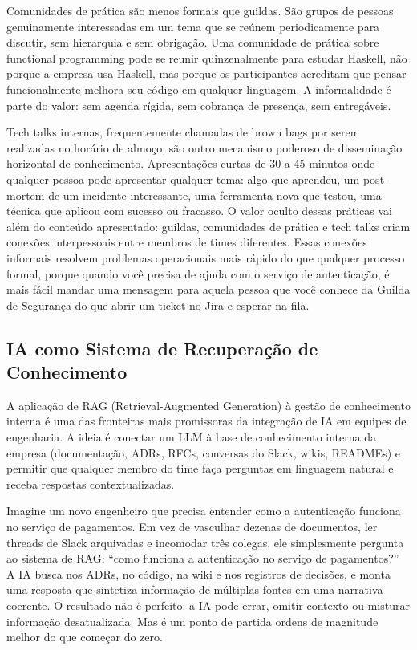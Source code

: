 Comunidades de prática são menos formais que guildas. São grupos de pessoas
genuinamente interessadas em um tema que se reúnem periodicamente para
discutir, sem hierarquia e sem obrigação. Uma comunidade de prática sobre
functional programming pode se reunir quinzenalmente para estudar Haskell,
não porque a empresa usa Haskell, mas porque os participantes acreditam que
pensar funcionalmente melhora seu código em qualquer linguagem. A informalidade
é parte do valor: sem agenda rígida, sem cobrança de presença, sem entregáveis.

Tech talks internas, frequentemente chamadas de brown bags por serem
realizadas no horário de almoço, são outro mecanismo poderoso de
disseminação horizontal de conhecimento. Apresentações curtas de 30 a 45
minutos onde qualquer pessoa pode apresentar qualquer tema: algo que aprendeu,
um post-mortem de um incidente interessante, uma ferramenta nova que testou,
uma técnica que aplicou com sucesso ou fracasso. O valor oculto dessas
práticas vai além do conteúdo apresentado: guildas, comunidades de prática e
tech talks criam conexões interpessoais entre membros de times diferentes.
Essas conexões informais resolvem problemas operacionais mais rápido do que
qualquer processo formal, porque quando você precisa de ajuda com o serviço
de autenticação, é mais fácil mandar uma mensagem para aquela pessoa que
você conhece da Guilda de Segurança do que abrir um ticket no Jira e esperar
na fila.

\subsection{IA como Sistema de Recuperação de Conhecimento}

A aplicação de RAG (Retrieval-Augmented Generation) à gestão de conhecimento
interna é uma das fronteiras mais promissoras da integração de IA em equipes
de engenharia. A ideia é conectar um LLM à base de conhecimento interna da
empresa (documentação, ADRs, RFCs, conversas do Slack, wikis, READMEs)
e permitir que qualquer membro do time faça perguntas em linguagem natural e
receba respostas contextualizadas.

Imagine um novo engenheiro que precisa entender como a autenticação funciona
no serviço de pagamentos. Em vez de vasculhar dezenas de documentos, ler
threads de Slack arquivadas e incomodar três colegas, ele simplesmente
pergunta ao sistema de RAG: ``como funciona a autenticação no serviço de
pagamentos?'' A IA busca nos ADRs, no código, na wiki e nos registros de
decisões, e monta uma resposta que sintetiza informação de múltiplas fontes em
uma narrativa coerente. O resultado não é perfeito: a IA pode errar, omitir contexto
ou misturar informação desatualizada. Mas é um ponto de partida ordens de
magnitude melhor do que começar do zero.

